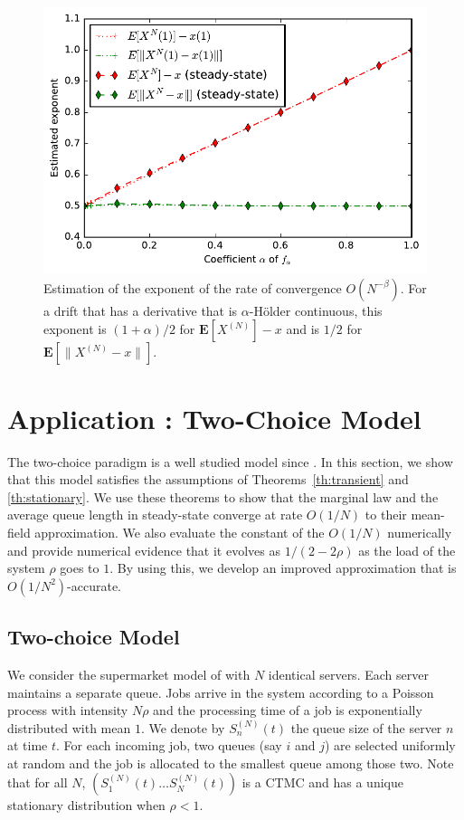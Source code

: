 \documentclass[sigconf]{acmart}
\newcommand\SN{S^{(N)}}
\newcommand\XN{X^{(N)}}
\newcommand\sesp[1]{\mathbf{E}[#1]}
\newcommand\snorm[1]{\|#1\|}
\begin{document}
\begin{figure}[ht]
  \centering
  \includegraphics[width=\linewidth]{exponent_birthDeath}
  \caption{Estimation of the exponent of the rate of convergence
    $O(N^{-\beta})$. For a drift that has a derivative that is
    $\alpha$-Hölder continuous, this exponent is $(1+\alpha)/2$ for
    $\sesp{\XN}-x$ and is $1/2$ for $\sesp{\snorm{\XN-x}}$.}
  \label{fig:expo_BD}
\end{figure}


\section{Application : Two-Choice Model}
\label{sec:two-choice}

The two-choice paradigm is a well studied model since
\cite{mitzenmacher1996power,vvedenskaya1996queueing}. In this section,
we show that this model satisfies the assumptions of
Theorems~\ref{th:transient} and \ref{th:stationary}. We use these
theorems to show that the marginal law and the average queue length in
steady-state converge at rate $O(1/N)$ to their mean-field
approximation. We also evaluate the constant of the $O(1/N)$
numerically and provide numerical evidence that it evolves as
$1/(2-2\rho)$ as the load of the system $\rho$ goes to $1$. By using
this, we develop an improved approximation that is
$O(1/N^2)$-accurate.


\subsection{Two-choice Model}
\label{sec:two-choice-model}

We consider the supermarket model of \cite{mitzenmacher1996power} with
$N$ identical servers. Each server maintains a separate queue. Jobs
arrive in the system according to a Poisson process with intensity
$N\rho$ and the processing time of a job is exponentially distributed
with mean $1$. We denote by $\SN_n(t)$ the queue size of the server
$n$ at time $t$. For each incoming job, two queues (say $i$ and $j$)
are selected uniformly at random and the job is allocated to the
smallest queue among those two. Note that for all $N$,
$(\SN_1(t)\dots \SN_N(t))$ is a CTMC and has a unique stationary
distribution when $\rho<1$.
\end{document}
